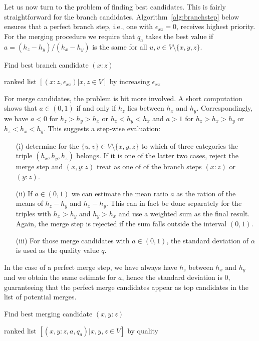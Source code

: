 \documentclass{article}
\begin{document}
Let us now turn to the problem of finding best candidates. This is fairly
straightforward for the branch candidates. Algorithm~\ref{alg:branchstep}
below ensures that a perfect branch step, i.e., one with $\epsilon_{xz}=0$,
receives highest priority. For the merging procedure we require that $q_a$
takes the best value if $a=(h_z-h_y)/(h_x-h_y)$ is the same for all $u,v\in
V\setminus\{x,y,z\}$.

\begin{algorithm}[H]
\caption{Find best branch candidate $(x:z)$ } 
\label{alg:branchstep}
\SetAlgoLined
{}
\Return ranked list $[(x:z,\epsilon_{xz})| x,z\in V]$ by increasing 
$\epsilon_{xz}$\;
\end{algorithm} 

For merge candidates, the problem is bit more involved.  A short
computation shows that $a\in(0,1)$ if and only if $h_z$ lies between $h_x$
and $h_y$. Correspondingly, we have $a<0$ for $h_z>h_y>h_x$ or
$h_z<h_y<h_x$ and $a>1$ for $h_z>h_x>h_y$ or $h_z<h_x<h_y$.  This suggests
a step-wise evaluation:
\begin{itemize} 
\item[(i)] determine for the $\{u,v\}\in V\setminus\{x,y,z\}$ to which of
  three categories the triple $(h_x,h_y,h_z)$ belongs. If it is one of the
  latter two cases, reject the merge step and $(x,y:z)$ treat as one of of
  the branch steps $(x:z)$ or $(y:z)$.
\item[(ii)] If $a\in(0,1)$ we can estimate the mean ratio $a$ as the ration
  of the means of $h_z-h_y$ and $h_x-h_y$. This can in fact be done
  separately for the triples with $h_x>h_y$ and $h_y>h_x$ and use a
  weighted sum as the final result. Again, the merge step is rejected if
  the sum falls outside the interval $(0,1)$. 
\item[(iii)] For those merge candidates with $a\in(0,1)$, the standard
  deviation of $\alpha$ is used as the quality value $q$.
\end{itemize}
In the case of a perfect merge step, we have always have $h_z$ between
$h_x$ and $h_y$ and we obtain the same estimate for $a$, hence the standard
deviation is $0$, guaranteeing that the perfect merge candidates appear as
top candidates in the list of potential merges. 

\begin{algorithm}[H]
\caption{Find best merging candidate $(x,y:z)$ } 
\label{alg:mergestep}

\Return ranked list $[(x,y:z,a,q_a)| x,y,z\in V]$ by quality\;
\end{algorithm} 
\end{document}
